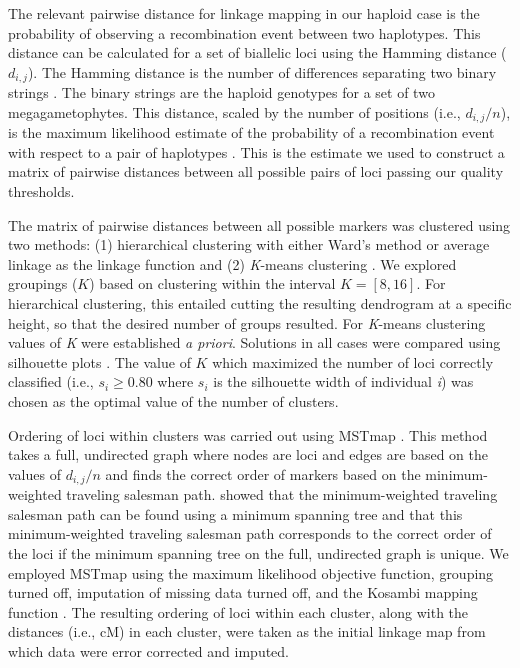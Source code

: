 \documentclass[11pt]{article}
\begin{document}
The relevant pairwise distance for linkage mapping in our haploid case is the probability of observing a recombination 
event between two haplotypes. This distance can be calculated for a set of biallelic loci using the Hamming distance ($d_{i,j}$).
The Hamming distance is the number of differences separating two binary strings \citep{Hamming:1950}. The binary strings are the haploid
genotypes for a set of two megagametophytes. This distance, scaled by the number of positions (i.e., $d_{i,j}/n$), 
is the maximum likelihood estimate of the probability of a recombination event with respect to a pair of haplotypes \citep{Wu:2008a}.
This is the estimate we used to construct a matrix of pairwise distances between all possible pairs of loci passing our quality thresholds.

The matrix of pairwise distances between all possible markers was clustered using two methods: (1) hierarchical clustering with 
either Ward's method \citep{Ward:1963} or average linkage \citep{Sokal:1958} as the linkage function and (2) \textit{K}-means clustering 
\citep{Hartigan:1979}. We explored groupings ($K$) based on clustering within the interval $K=[8,16]$. For hierarchical clustering, this 
entailed cutting the resulting dendrogram at a specific height, so that the desired number of groups resulted. For \textit{K}-means clustering
values of \textit{K} were established \textit{a priori}. Solutions in all cases were compared using silhouette plots \citep{Rousseeuw:1987}.
The value of $K$ which maximized the number of loci correctly classified  (i.e., $s_{i} \geq 0.80$ where $s_{i}$ is the 
silhouette width of individual \textit{i}) was chosen as the optimal value of the number of clusters.

Ordering of loci within clusters was carried out using MSTmap \citep{Wu:2008a}. This method takes a full, undirected graph where nodes are 
loci and edges are based on the values of $d_{i,j}/n$ and finds the correct order of markers based on the minimum-weighted traveling salesman path. 
\citet{Wu:2008a} showed that the minimum-weighted traveling salesman path
can be found using a minimum spanning tree and that this minimum-weighted traveling
salesman path corresponds to the correct order of the loci if the minimum spanning tree on
the full, undirected graph is unique. We employed MSTmap using the maximum likelihood objective function, grouping turned off, imputation of 
missing data turned off, and the Kosambi mapping function \citep{Kosambi:1944}. The resulting ordering of loci
within each cluster, along with the distances (i.e., cM) in each cluster, were taken as the initial linkage map from which
data were error corrected and imputed.
 
\end{document}
